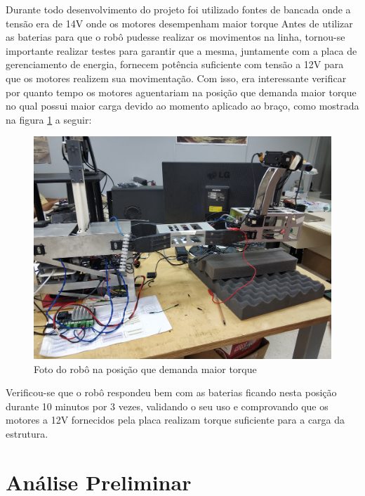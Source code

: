 Durante todo desenvolvimento do projeto foi utilizado fontes de bancada onde a tensão era de 14V onde os motores desempenham maior torque 
Antes de utilizar as baterias para que o robô pudesse realizar os movimentos na linha, tornou-se importante realizar testes para garantir que a mesma, juntamente com a placa de gerenciamento de energia, fornecem potência suficiente com tensão a 12V para que os motores realizem sua movimentação.
Com isso, era interessante verificar por quanto tempo os motores aguentariam na posição que demanda maior torque no qual possui maior carga devido ao momento aplicado ao braço, como mostrada na figura \ref{fig:robo_pior_pos} a seguir:
\begin{figure}[H]
	\centering
	\includegraphics[scale=0.08]{Figures/robo_pior_posicao.jpg}
	\caption{Foto do robô na posição que demanda maior torque}
	\label{fig:robo_pior_pos}
\end{figure}

Verificou-se que o robô respondeu bem com as baterias ficando nesta posição durante 10 minutos por 3 vezes, validando o seu uso e comprovando que os motores a 12V fornecidos pela placa realizam torque suficiente para a carga da estrutura.

\section{Análise Preliminar}\label{sec:anal_prem}






